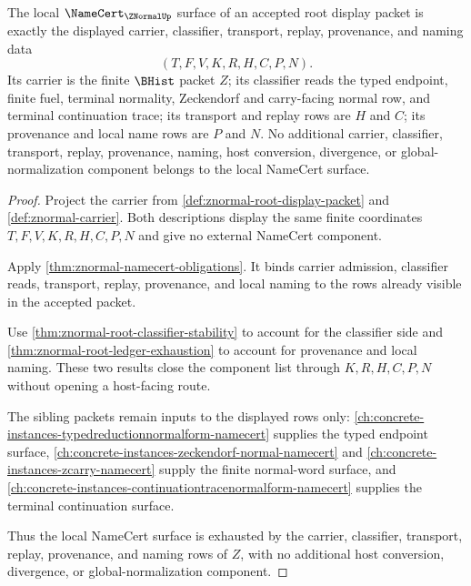 \begin{theorem}\label{thm:znormal-root-namecert-component-exhaustion}
The local $\NameCert_{\ZNormalUp}$ surface of an accepted root display packet is exactly the displayed carrier, classifier, transport, replay, provenance, and naming data
$$
(T,F,V,K,R,H,C,P,N).
$$
Its carrier is the finite $\BHist$ packet $Z$; its classifier reads the typed endpoint, finite fuel, terminal normality, Zeckendorf and carry-facing normal row, and terminal continuation trace; its transport and replay rows are $H$ and $C$; its provenance and local name rows are $P$ and $N$. No additional carrier, classifier, transport, replay, provenance, naming, host conversion, divergence, or global-normalization component belongs to the local NameCert surface.
\end{theorem}
\begin{proof}
Project the carrier from \autoref{def:znormal-root-display-packet} and \autoref{def:znormal-carrier}. Both descriptions display the same finite coordinates $T,F,V,K,R,H,C,P,N$ and give no external NameCert component.

Apply \autoref{thm:znormal-namecert-obligations}. It binds carrier admission, classifier reads, transport, replay, provenance, and local naming to the rows already visible in the accepted packet.

Use \autoref{thm:znormal-root-classifier-stability} to account for the classifier side and \autoref{thm:znormal-root-ledger-exhaustion} to account for provenance and local naming. These two results close the component list through $K,R,H,C,P,N$ without opening a host-facing route.

The sibling packets remain inputs to the displayed rows only: \autoref{ch:concrete-instances-typedreductionnormalform-namecert} supplies the typed endpoint surface, \autoref{ch:concrete-instances-zeckendorf-normal-namecert} and \autoref{ch:concrete-instances-zcarry-namecert} supply the finite normal-word surface, and \autoref{ch:concrete-instances-continuationtracenormalform-namecert} supplies the terminal continuation surface.

Thus the local NameCert surface is exhausted by the carrier, classifier, transport, replay, provenance, and naming rows of $Z$, with no additional host conversion, divergence, or global-normalization component.
\end{proof}

